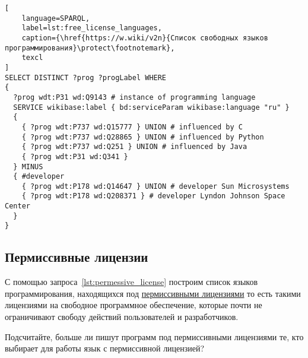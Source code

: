 \begin{lstlisting}[
	language=SPARQL,
	label=lst:free_license_languages,
	caption={\href{https://w.wiki/v2n}{Список свободных языков программирования}\protect\footnotemark},
	texcl
]
SELECT DISTINCT ?prog ?progLabel WHERE
{
  ?prog wdt:P31 wd:Q9143 # instance of programming language
  SERVICE wikibase:label { bd:serviceParam wikibase:language "ru" } 
  {
    { ?prog wdt:P737 wd:Q15777 } UNION # influenced by C
    { ?prog wdt:P737 wd:Q28865 } UNION # influenced by Python
    { ?prog wdt:P737 wd:Q251 } UNION # influenced by Java
    { ?prog wdt:P31 wd:Q341 }
  } MINUS
  { #developer
    { ?prog wdt:P178 wd:Q14647 } UNION # developer Sun Microsystems
    { ?prog wdt:P178 wd:Q208371 } # developer Lyndon Johnson Space Center
  }
}
\end{lstlisting}



\subsection{Пермиссивные лицензии}
%
С помощью запроса~\ref{lst:permessive_license} 
построим список языков программирования, 
находящихся под \href{https://en.wikipedia.org/wiki/Permissive_software_license}{пермиссивными лицензиями} 
то есть такими лицензиями на свободное программное обеспечение, 
которые почти не ограничивают свободу действий пользователей и разработчиков. 

Подсчитайте, больше ли пишут программ под пермиссивными лицензиями те, 
кто выбирает для работы язык с пермиссивной лицензией?  

